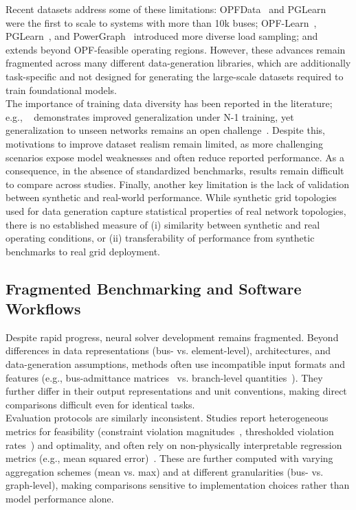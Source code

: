 Recent datasets address some of these limitations: OPFData~\cite{lovett2024opfdatalargescaledatasetsac} and PGLearn~\cite{pglearn} were the first to scale to systems with more than 10k buses; OPF-Learn~\cite{opflearn}, PGLearn~\cite{pglearn}, and PowerGraph~\cite{varbella2024powergraph} introduced more diverse load sampling; and \pfdelta~\cite{NEURIPS2025_d000ef56} extends beyond OPF-feasible operating regions. However, these advances remain fragmented across many different data-generation libraries, which are additionally task-specific and not designed for generating the large-scale datasets required to train foundational models.\\

The importance of training data diversity has been reported in the literature; e.g., \pfdelta~\cite{NEURIPS2025_d000ef56} demonstrates improved generalization under N-1 training, yet generalization to unseen networks remains an open challenge~\cite{yang2026gridsfm,arowolo2025,DONON2020106547}. Despite this, motivations to improve dataset realism remain limited, as more challenging scenarios expose model weaknesses and often reduce reported performance. As a consequence, in the absence of standardized benchmarks, results remain difficult to compare across studies. Finally, another key limitation is the lack of validation between synthetic and real-world performance. While synthetic grid topologies used for data generation capture statistical properties of real network topologies, there is no established measure of (i) similarity between synthetic and real operating conditions, or (ii) transferability of performance from synthetic benchmarks to real grid deployment.

\subsection{Fragmented Benchmarking and Software Workflows}

Despite rapid progress, neural solver development remains fragmented. Beyond differences in data representations (bus- vs. element-level), architectures, and data-generation assumptions, methods often use incompatible input formats and features (e.g., bus-admittance matrices~\cite{varbella2024powergraph} vs. branch-level quantities~\cite{arowolo2025}). They further differ in their output representations and unit conventions, making direct comparisons difficult even for identical tasks.\\

Evaluation protocols are similarly inconsistent. Studies report heterogeneous metrics for feasibility (constraint violation magnitudes~\cite{arowolo2025, NEURIPS2025_3874e2be}, thresholded violation rates~\cite{piloto2024}) and optimality, and often rely on non-physically interpretable regression metrics (e.g., mean squared error)~\cite{varbella2024powergraph}. These are further computed with varying aggregation schemes (mean vs. max) and at different granularities (bus- vs. graph-level), making comparisons sensitive to implementation choices rather than model performance alone.\\


